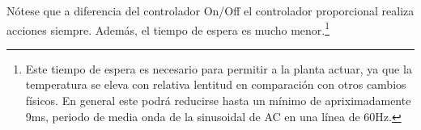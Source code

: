 Nótese que a diferencia del controlador On/Off el controlador proporcional realiza acciones siempre. Además, el tiempo de espera es mucho menor.\footnote{Este tiempo de espera es necesario para permitir a la planta actuar, ya que la temperatura se eleva con relativa lentitud en comparación con otros cambios físicos. En general este podrá reducirse hasta un mínimo de apriximadamente 9ms, periodo de media onda de la sinusoidal de AC en una línea de 60Hz.}
